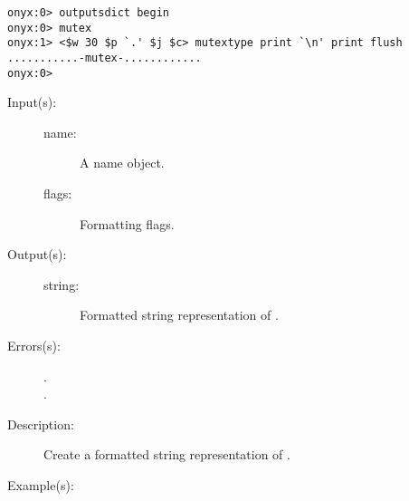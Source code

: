 \begin{description}
\begin{description}
\begin{verbatim}
onyx:0> outputsdict begin
onyx:0> mutex
onyx:1> <$w 30 $p `.' $j $c> mutextype print `\n' print flush
...........-mutex-............
onyx:0>
		\end{verbatim}
	\end{description}
\label{outputsdict:nametype}
\item[{\onyxop{name flags}{nametype}{string}}: ]
	\begin{description}\item[]
	\item[Input(s): ]
		\begin{description}\item[]
		\item[name: ]
			A name object.
		\item[flags: ]
			Formatting flags.
		\end{description}
	\item[Output(s): ]
		\begin{description}\item[]
		\item[string: ]
			Formatted string representation of .
		\end{description}
	\item[Errors(s): ]
		\begin{description}\item[]
		\item[.]
		\item[.]
		\end{description}
	\item[Description: ]
		Create a formatted string representation of .
	\item[Example(s): ]\begin{verbatim}


\end{verbatim}
\end{description}
\end{description}
